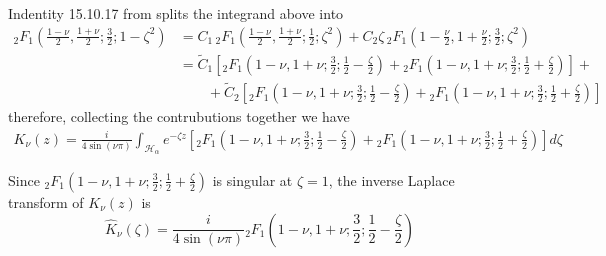 \documentclass{article}
\begin{document}
Indentity 15.10.17 from \cite{dlmf} splits the integrand above into
\begin{align*}
{}_2F_1\left(\frac{1-\nu}{2},\frac{1+\nu}{2};\frac{3}{2};1-\zeta^2\right)&=C_1 \, {}_2F_1\left(\frac{1-\nu}{2},\frac{1+\nu}{2};\frac{1}{2};\zeta^2\right)+C_2\zeta \,{}_2F_1\left(1-\frac{\nu}{2},1+\frac{\nu}{2};\frac{3}{2};\zeta^2\right)\\
&=\tilde{C}_1\left[{}_2F_1\left({1-\nu},{1+\nu};\frac{3}{2};\frac{1}{2}-\frac{\zeta}{2}\right)+{}_2F_1\left({1-\nu},{1+\nu};\frac{3}{2};\frac{1}{2}+\frac{\zeta}{2}\right)\right]+\\
&\qquad+\tilde{C}_2\left[{}_2F_1\left({1-\nu},{1+\nu};\frac{3}{2};\frac{1}{2}-\frac{\zeta}{2}\right)+{}_2F_1\left({1-\nu},{1+\nu};\frac{3}{2};\frac{1}{2}+\frac{\zeta}{2}\right)\right]
\end{align*}
therefore, collecting the contrubutions together we have 
\begin{multline}
K_{\nu}(z)=\frac{i}{4\sin(\nu\pi)}\int_{\mathcal{H}_{\alpha}}e^{-\zeta z}\left[{}_2F_1\left({1-\nu},{1+\nu};\frac{3}{2};\frac{1}{2}-\frac{\zeta}{2}\right)+{}_2F_1\left({1-\nu},{1+\nu};\frac{3}{2};\frac{1}{2}+\frac{\zeta}{2}\right)\right] d\zeta
\end{multline}

Since ${}_2F_1\left({1-\nu},{1+\nu};\frac{3}{2};\frac{1}{2}+\frac{\zeta}{2}\right) $ is singular at $\zeta=1$, the inverse Laplace transform of $K_\nu(z)$ is 
\[
\hat{K}_{\nu}(\zeta)=\frac{i}{4\sin(\nu\pi)}{}_2F_1\left({1-\nu},{1+\nu};\frac{3}{2};\frac{1}{2}-\frac{\zeta}{2}\right)
\] 
\color{black}




\end{document}
